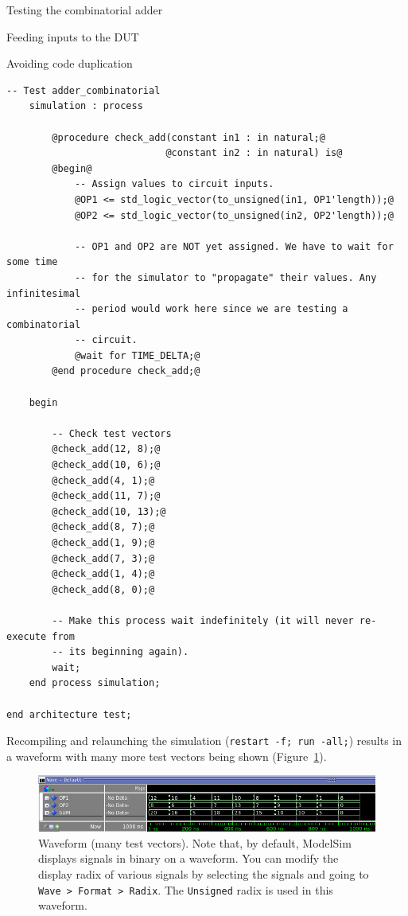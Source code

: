 \documentclass[lab]{course}
\begin{document}
\begin{section}{Testing the combinatorial adder}
\begin{subsection}{Feeding inputs to the DUT}
\begin{subsubsection}{Avoiding code duplication}
\begin{lstlisting}[caption={Refactored test vector feeding code into a \emph{procedure} called \texttt{check\_add}}, label={lst:combinatorial_refactored_test_vector_feeding_code}]
    -- Test adder_combinatorial
    simulation : process

        @procedure check_add(constant in1 : in natural;@
                            @constant in2 : in natural) is@
        @begin@
            -- Assign values to circuit inputs.
            @OP1 <= std_logic_vector(to_unsigned(in1, OP1'length));@
            @OP2 <= std_logic_vector(to_unsigned(in2, OP2'length));@

            -- OP1 and OP2 are NOT yet assigned. We have to wait for some time
            -- for the simulator to "propagate" their values. Any infinitesimal
            -- period would work here since we are testing a combinatorial
            -- circuit.
            @wait for TIME_DELTA;@
        @end procedure check_add;@

    begin

        -- Check test vectors
        @check_add(12, 8);@
        @check_add(10, 6);@
        @check_add(4, 1);@
        @check_add(11, 7);@
        @check_add(10, 13);@
        @check_add(8, 7);@
        @check_add(1, 9);@
        @check_add(7, 3);@
        @check_add(1, 4);@
        @check_add(8, 0);@

        -- Make this process wait indefinitely (it will never re-execute from
        -- its beginning again).
        wait;
    end process simulation;

end architecture test;
            \end{lstlisting}

            Recompiling and relaunching the simulation (\verb+restart -f; run -all;+) results in a waveform with many more test vectors being shown (Figure~\ref{fig:waveform_combinatorial_process_avoid_code_duplication}).

            \begin{figure}[!h]
                \begin{centering}
                    \includegraphics[width=1.0\textwidth]{figs/waveform_combinatorial_process_avoid_code_duplication.png}
                    \caption{Waveform (many test vectors). Note that, by default, ModelSim displays signals in binary on a waveform. You can modify the display radix of various signals by selecting the signals and going to \texttt{Wave > Format > Radix}. The \texttt{Unsigned} radix is used in this waveform.}
                    \label{fig:waveform_combinatorial_process_avoid_code_duplication}
                \end{centering}
            \end{figure}
        \end{subsubsection}


\end{subsection}
\end{section}
\end{document}
